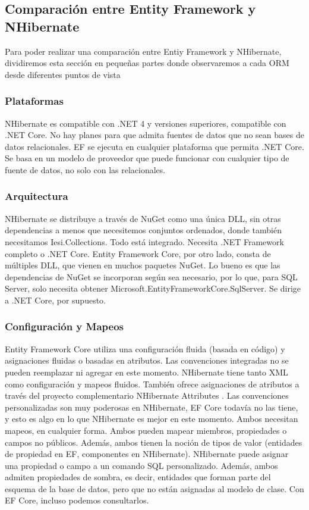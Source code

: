 \documentclass{article}
\begin{document}
\subsection{Comparación entre Entity Framework y NHibernate}
Para poder realizar una comparación entre Entiy Framework y NHibernate, dividiremos esta sección en pequeñas partes donde observaremos a cada ORM desde diferentes puntos de vista
\subsubsection{Plataformas}
NHibernate es compatible con .NET 4 y versiones superiores, compatible con .NET Core. No hay planes para que admita fuentes de datos que no sean bases de datos relacionales.
EF se ejecuta en cualquier plataforma que permita .NET Core. Se basa en un modelo de proveedor que puede funcionar con cualquier tipo de fuente de datos, no solo con las relacionales.

\subsubsection{Arquitectura}
NHibernate se distribuye a través de NuGet como una única DLL, sin otras dependencias a menos que necesitemos conjuntos ordenados, donde también necesitamos Iesi.Collections. Todo está integrado. Necesita .NET Framework completo o .NET Core.
Entity Framework Core, por otro lado, consta de múltiples DLL, que vienen en muchos paquetes NuGet. Lo bueno es que las dependencias de NuGet se incorporan según sea necesario, por lo que, para SQL Server, solo necesita obtener Microsoft.EntityFrameworkCore.SqlServer. Se dirige a .NET Core, por supuesto.

\subsubsection{Configuración y Mapeos}
Entity Framework Core utiliza una configuración fluida (basada en código) y asignaciones fluidas o basadas en atributos. Las convenciones integradas no se pueden reemplazar ni agregar en este momento.
NHibernate tiene tanto XML como configuración y mapeos fluidos. También ofrece asignaciones de atributos a través del proyecto complementario NHibernate Attributes . Las convenciones personalizadas son muy poderosas en NHibernate, EF Core todavía no las tiene, y esto es algo en lo que NHibernate es mejor en este momento.
Ambos necesitan mapeos, en cualquier forma. Ambos pueden mapear miembros, propiedades o campos no públicos. Además, ambos tienen la noción de tipos de valor (entidades de propiedad en EF, componentes en NHibernate). NHibernate puede asignar una propiedad o campo a un comando SQL personalizado.
Además, ambos admiten propiedades de sombra, es decir, entidades que forman parte del esquema de la base de datos, pero que no están asignadas al modelo de clase. Con EF Core, incluso podemos consultarlos.
\end{document}
